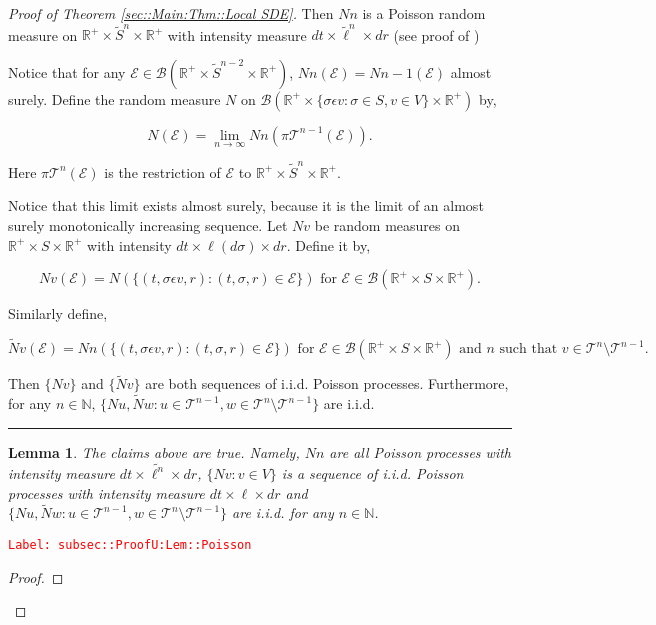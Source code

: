 \documentclass[12pt]{article}
\newcommand{\mb}{\mathbb}
\newcommand{\mc}{\mathcal}
\newcommand{\ms}{\mathscr}
\newcommand{\ra}{\rightarrow}
\newcommand{\te}{\text}
\newcommand{\ep}{\epsilon}
\newcommand{\tr}{\textcolor{red}}
\newcommand{\labe}[1]{\tr{\texttt{Label: #1}}}
\newcommand{\ind}{\hspace{24pt}}
\newcommand{\lin}{\rule{\linewidth}{0.4 pt}}
\renewcommand{\v}{v}							%
\newcommand{\vv}{u}								%
\newcommand{\vvv}{w}							%
\renewcommand{\S}{S}							%
\newcommand{\s}{\sigma}							%
\newcommand{\ev}{\ep}							%
\renewcommand{\t}{t}							%
\newcommand{\proj}{\pi}							%
\newcommand{\tree}{\mc{T}}						%
\newcommand{\sln}[1]{^{#1}}						%
\newcommand{\poiss}{N}							%
\newcommand{\Sm}{\ell}							%
\renewcommand{\r}{r}							%
\newcommand{\alt}[1]{\widetilde{#1}}			%
\newcommand{\evnt}{\mc{E}}						%
\newtheorem{lem}[thms]{Lemma}
\begin{document}
\begin{proof}[Proof of Theorem \ref{sec::Main:Thm::Local SDE}]
Then \(\poiss{n}\) is a Poisson random measure on \(\mb{R}^+\times\alt{\S}^n\times \mb{R}^+\) with intensity measure \(d\t\times \alt{\Sm}^n\times d\r\) (see proof of \cite[Theorem 14.7.1(b)]{DalVer08})

\ind Notice that for any \(\evnt{} \in \ms{B}(\mb{R}^+\times \alt{\S}^{n-2}\times \mb{R}^+)\), \(\poiss{n}(\evnt{}) = \poiss{n-1}(\evnt{})\) almost surely. Define the random measure \(\poiss{}\) on \(\ms{B}(\mb{R}^+\times \{\s\ev{\v}:\s\in \S,\v \in V\}\times \mb{R}^+)\) by,

\[\poiss{}(\evnt{}) = \lim_{n \ra\infty}\poiss{n}\left(\proj{\tree\sln{n-1}}{}(\evnt{})\right).\]

Here \(\proj{\tree\sln{n}}{}(\evnt{})\) is the restriction of \(\evnt{}\) to \(\mb{R}^+\times \alt{\S}^n\times\mb{R}^+\). 

\ind Notice that this limit exists almost surely, because it is the limit of an almost surely monotonically increasing sequence. Let \(\poiss{\v}\) be random measures on \(\mb{R}^+\times\S\times\mb{R}^+\) with intensity \(d\t\times\Sm(d\s)\times d\r\). Define it by,

\[\poiss{\v}(\evnt{}) = \poiss{}\left(\{(\t,\s\ev{\v},\r):(\t,\s,\r)\in \evnt{}\}\right) \te{ for } \evnt{} \in \ms{B}(\mb{R}^+\times\S\times\mb{R}^+).\]

Similarly define,

\[\alt{\poiss}{\v}(\evnt{}) = \poiss{n}\left(\{(\t,\s\ev{\v},\r):(\t,\s,\r)\in \evnt{}\}\right)\te{ for } \evnt{} \in \ms{B}(\mb{R}^+\times\S\times\mb{R}^+)\te{ and }n\te{ such that } \v\in \tree\sln{n}\setminus\tree\sln{n-1}.\]

Then \(\{\poiss{\v}\}\) and \(\{\alt{\poiss}{\v}\}\) are both sequences of i.i.d. Poisson processes. Furthermore, for any \(n \in \mb{N}\), \(\{\poiss{\vv},\alt{\poiss}{\vvv}:\vv\in \tree\sln{n-1},\vvv\in\tree\sln{n}\setminus\tree\sln{n-1}\}\) are i.i.d.

\lin

\begin{lem}
The claims above are true. Namely, \(\poiss{n}\) are all Poisson processes with intensity measure \(d\t\times\alt{\Sm^{n}}\times d\r\), \(\{\poiss{\v}:\v\in V\}\) is a sequence of i.i.d. Poisson processes with intensity measure \(d\t\times\Sm\times d\r\) and \(\{\poiss{\vv},\alt{\poiss}{\vvv}:\vv\in \tree\sln{n-1},\vvv\in\tree\sln{n}\setminus\tree\sln{n-1}\}\) are i.i.d. for any \(n \in \mb{N}\).

\label{subsec::ProofU:Lem::Poisson}
\end{lem}
\labe{subsec::ProofU:Lem::Poisson}
\begin{proof}


\end{proof}
\end{proof}
\end{document}
